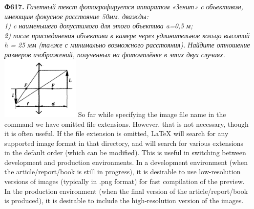 \documentclass{article}
\begin{document}
\begin{vwcol}
    \textbf{Ф617.} 
    \textit{Газетный текст фотографируется аппаратом «Зенит» c объективом, имеющим фокусное расстояние 50мм. дважды: \\1) c наименьшего допустимого для этого объектива a=0,5 м;\\2) после присоединения объектива к камере через удлинительное кольцо высотой h = 25 мм (таeже с минимально возможного расстояния). Найдите отношение размеров изображений, полученных на фотомплёнке в этих двух случаях.}
    \vspace{5cm}
    \includegraphics[width=0.29\textwidth]{image}
    \newpage
    So far while specifying the image file name in the  command we have omitted file extensions. However, that is not necessary, though it is often useful. If the file extension is omitted, LaTeX will search for any supported image format in that directory, and will search for various extensions in the default order (which can be modified).
    This is useful in switching between development and production environments. In a development environment (when the article/report/book is still in progress), it is desirable to use low-resolution versions of images (typically in .png format) for fast compilation of the preview. In the production environment (when the final version of the article/report/book is produced), it is desirable to include the high-resolution version of the images. 

\end{vwcol} 
\end{document}
